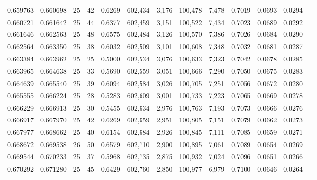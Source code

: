 \begin{tabular}{rrrrrrrrrrrrr}
0.659763 & 0.660698 &    25 &  42 &                                     0.6269 & 602,434 &   3,176 & 100,478 &   7,478 & 0.7019 & 0.0693 & 0.0294 \\
0.660721 & 0.661642 &    25 &  44 &                                     0.6377 & 602,459 &   3,151 & 100,522 &   7,434 & 0.7023 & 0.0689 & 0.0292 \\
0.661646 & 0.662563 &    25 &  48 &                                     0.6575 & 602,484 &   3,126 & 100,570 &   7,386 & 0.7026 & 0.0684 & 0.0290 \\
0.662564 & 0.663350 &    25 &  38 &                                     0.6032 & 602,509 &   3,101 & 100,608 &   7,348 & 0.7032 & 0.0681 & 0.0287 \\
0.663384 & 0.663962 &    25 &  25 &                                     0.5000 & 602,534 &   3,076 & 100,633 &   7,323 & 0.7042 & 0.0678 & 0.0285 \\
0.663965 & 0.664638 &    25 &  33 &                                     0.5690 & 602,559 &   3,051 & 100,666 &   7,290 & 0.7050 & 0.0675 & 0.0283 \\
0.664639 & 0.665540 &    25 &  39 &                                     0.6094 & 602,584 &   3,026 & 100,705 &   7,251 & 0.7056 & 0.0672 & 0.0280 \\
0.665555 & 0.666224 &    25 &  28 &                                     0.5283 & 602,609 &   3,001 & 100,733 &   7,223 & 0.7065 & 0.0669 & 0.0278 \\
0.666229 & 0.666913 &    25 &  30 &                                     0.5455 & 602,634 &   2,976 & 100,763 &   7,193 & 0.7073 & 0.0666 & 0.0276 \\
0.666917 & 0.667970 &    25 &  42 &                                     0.6269 & 602,659 &   2,951 & 100,805 &   7,151 & 0.7079 & 0.0662 & 0.0273 \\
0.667977 & 0.668662 &    25 &  40 &                                     0.6154 & 602,684 &   2,926 & 100,845 &   7,111 & 0.7085 & 0.0659 & 0.0271 \\
0.668672 & 0.669538 &    26 &  50 &                                     0.6579 & 602,710 &   2,900 & 100,895 &   7,061 & 0.7089 & 0.0654 & 0.0269 \\
0.669544 & 0.670233 &    25 &  37 &                                     0.5968 & 602,735 &   2,875 & 100,932 &   7,024 & 0.7096 & 0.0651 & 0.0266 \\
0.670292 & 0.671280 &    25 &  45 &                                     0.6429 & 602,760 &   2,850 & 100,977 &   6,979 & 0.7100 & 0.0646 & 0.0264 \\

\end{tabular}
